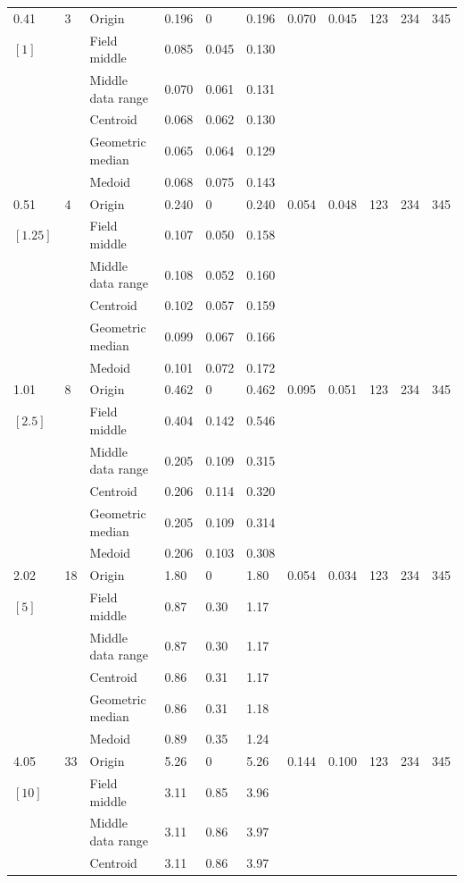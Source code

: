 \documentclass[phd,showgrids]{ndsu-thesis-2022}
\begin{document}
\begin{landscape}
{{\begin{ThreePartTable}
\begin{longtable}{lll lll ll rrr}
0.41 & 3 & Origin  & 0.196 & 0 & 0.196 & 0.070 & 0.045 & 123 & 234 & 345\\
$[1]$ &  & Field middle  & 0.085 & 0.045 & 0.130 \\
 &  & Middle data range  & 0.070 & 0.061 & 0.131 \\
 &  & Centroid & 0.068 & 0.062 & 0.130 \\
 &  & Geometric median & 0.065 & 0.064 & 0.129 \\
 &  & Medoid  & 0.068 & 0.075 & 0.143 \\
\midrule
0.51 & 4 & Origin  & 0.240 & 0 & 0.240 & 0.054 & 0.048 & 123 & 234 & 345\\
$[1.25]$ &  & Field middle  & 0.107 & 0.050 & 0.158 \\
 &  & Middle data range  & 0.108 & 0.052 & 0.160 \\
 &  & Centroid & 0.102 & 0.057 & 0.159 \\
 &  & Geometric median & 0.099 & 0.067 & 0.166 \\
 &  & Medoid  & 0.101 & 0.072 & 0.172 \\
\midrule
1.01 & 8 & Origin  & 0.462 & 0 & 0.462 & 0.095 & 0.051  & 123 & 234 & 345\\
$[2.5]$ &  & Field middle  & 0.404 & 0.142 & 0.546 \\
 &  & Middle data range  & 0.205 & 0.109 & 0.315 \\
 &  & Centroid & 0.206 & 0.114 & 0.320 \\
 &  & Geometric median & 0.205 & 0.109 & 0.314 \\
 &  & Medoid  & 0.206 & 0.103 & 0.308 \\
\midrule
2.02 & 18 & Origin  & 1.80 & 0 & 1.80 & 0.054 & 0.034 & 123 & 234 & 345 \\
$[5]$ &  & Field middle  & 0.87 & 0.30 & 1.17 \\
 &  & Middle data range  & 0.87 & 0.30 & 1.17 \\
 &  & Centroid & 0.86 & 0.31 & 1.17 \\
 &  & Geometric median & 0.86 & 0.31 & 1.18 \\
 &  & Medoid  & 0.89 & 0.35 & 1.24 \\
\midrule
4.05 & 33 & Origin  & 5.26 & 0 & 5.26 & 0.144 & 0.100 & 123 & 234 & 345 \\
$[10]$ &  & Field middle  & 3.11 & 0.85 & 3.96 \\
 &  & Middle data range  & 3.11 & 0.86 & 3.97 \\
 &  & Centroid & 3.11 & 0.86 & 3.97 \\

\end{longtable}
\end{ThreePartTable}}}
\end{landscape}
\end{document}

